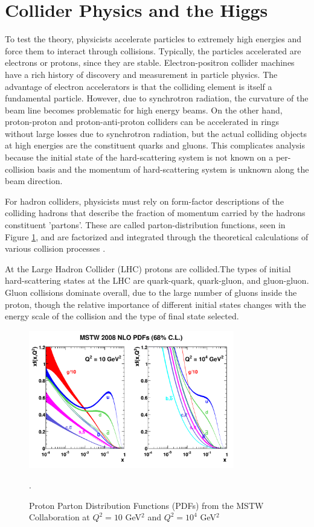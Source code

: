 \section{Collider Physics and the Higgs} 

To test the theory, physicists accelerate particles to extremely high energies and force
them to interact through collisions. Typically, the particles accelerated are
electrons or protons, since they are stable. Electron-positron collider
machines have a rich history of discovery and measurement in particle physics.
The advantage of electron accelerators is that the colliding element is itself
a fundamental particle. However, due to synchrotron radiation, the curvature of the
beam line becomes problematic for high energy beams.  On the other
hand, proton-proton and proton-anti-proton colliders can be accelerated in rings without large losses
due to synchrotron radiation, but the actual colliding objects at high
energies are the constituent quarks and gluons. This complicates analysis
because the initial state of the hard-scattering system is not known on a per-collision
basis and the momentum of hard-scattering system is unknown along the beam direction.

For hadron colliders, physicists must rely on form-factor descriptions of the colliding hadrons
that describe the fraction of momentum carried by the
hadrons constituent 'partons'.  These are called parton-distribution
functions, seen in Figure \ref{figure:theory_pdf}, and are factorized
and integrated through the theoretical calculations of various collision processes \cite{1985.Collins.factorization-theorem}.

At the Large Hadron Collider (LHC) protons are collided.The types of initial hard-scattering states at the LHC are quark-quark, quark-gluon, and gluon-gluon. Gluon collisions dominate overall,
  due to the large number of gluons inside the proton, though the relative importance of different initial states changes with the
  energy scale of the collision and the type of final state selected.  

\begin{figure}[!t]
\centering 
\includegraphics[width=0.8\textwidth]{figs/theory/mstw2008nlo68cl_allpdfs.pdf}
\caption {Proton Parton Distribution Functions (PDFs) from the MSTW Collaboration at $Q^2 = 10$ GeV$^2$ and $Q^2 = 10^4$ GeV$^2$}.
\label{figure:theory_pdf}
\end{figure}

